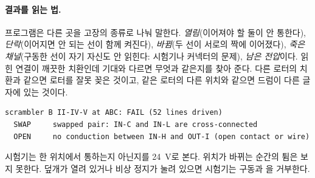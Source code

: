 \paragraph{결과를 읽는 법.} 프로그램은 다른 곳을 고장의 종류로 나눠 말한다. \emph{열림}(이어져야 할 둘이 안
통한다), \emph{단락}(이어지면 안 되는 선이 함께 켜진다), \emph{바뀜}(두 선이 서로의 짝에 이어졌다), \emph{죽은
채널}(구동한 선이 자기 자신도 안 읽힌다: 시험기나 커넥터의 문제), \emph{남은 전압}이다. 읽힌 연결이 깨끗한
치환인데 기대와 다르면 무엇과 같은지를 찾아 준다. 다른 로터의 치환과 같으면 로터를 잘못 꽂은 것이고, 같은
로터의 다른 위치와 같으면 드럼이 다른 글자에 있는 것이다.

\begin{lstlisting}[numbers=none]
scrambler B II-IV-V at ABC: FAIL (52 lines driven)
  SWAP     swapped pair: IN-C and IN-L are cross-connected
  OPEN     no conduction between IN-H and OUT-I (open contact or wire)
\end{lstlisting}

시험기는 한 위치에서 통하는지 아닌지를 24~V로 본다. 위치가 바뀌는 순간의 튐은 보지 못한다. 덮개가 열려 있거나
비상 정지가 눌려 있으면 시험기는 구동과 을 거부한다.
